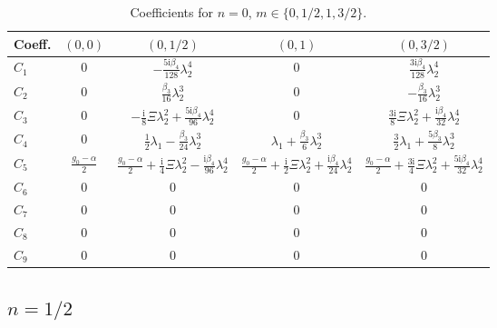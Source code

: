 \documentclass[11pt]{article}
\newcommand{\ii}{\mathrm{i}}
\begin{document}
\begin{table}[htbp]
\centering\small
\caption{Coefficients for $n=0$, $m\in\{0,1/2,1,3/2\}$.}
\begin{tabular}{lcccc}
\toprule
Coeff. & $(0,0)$ & $(0,1/2)$ & $(0,1)$ & $(0,3/2)$ \\
\midrule
$C_1$ & $0$ & $-\tfrac{5\ii\beta_4}{128}\lambda_2^4$ & $0$ & $\tfrac{3\ii\beta_4}{128}\lambda_2^4$ \\
$C_2$ & $0$ & $\tfrac{\beta_3}{16}\lambda_2^3$ & $0$ & $-\tfrac{\beta_3}{16}\lambda_2^3$ \\
$C_3$ & $0$ & $-\tfrac{\ii}{8}\Xi\lambda_2^2+\tfrac{5\ii\beta_4}{96}\lambda_2^4$ & $0$ & $\tfrac{3\ii}{8}\Xi\lambda_2^2+\tfrac{\ii\beta_4}{32}\lambda_2^4$ \\
$C_4$ & $0$ & $\tfrac12\lambda_1-\tfrac{\beta_3}{24}\lambda_2^3$ & $\lambda_1+\tfrac{\beta_3}{6}\lambda_2^3$ & $\tfrac32\lambda_1+\tfrac{5\beta_3}{8}\lambda_2^3$ \\
$C_5$ & $\tfrac{g_0-\alpha}{2}$ & $\tfrac{g_0-\alpha}{2}+\tfrac{\ii}{4}\Xi\lambda_2^2-\tfrac{\ii\beta_4}{96}\lambda_2^4$ & $\tfrac{g_0-\alpha}{2}+\tfrac{\ii}{2}\Xi\lambda_2^2+\tfrac{\ii\beta_4}{24}\lambda_2^4$ & $\tfrac{g_0-\alpha}{2}+\tfrac{3\ii}{4}\Xi\lambda_2^2+\tfrac{5\ii\beta_4}{32}\lambda_2^4$ \\
$C_6$ & $0$ & $0$ & $0$ & $0$ \\
$C_7$ & $0$ & $0$ & $0$ & $0$ \\
$C_8$ & $0$ & $0$ & $0$ & $0$ \\
$C_9$ & $0$ & $0$ & $0$ & $0$ \\
\bottomrule
\end{tabular}
\end{table}

\subsection{$n=1/2$}
\end{document}
